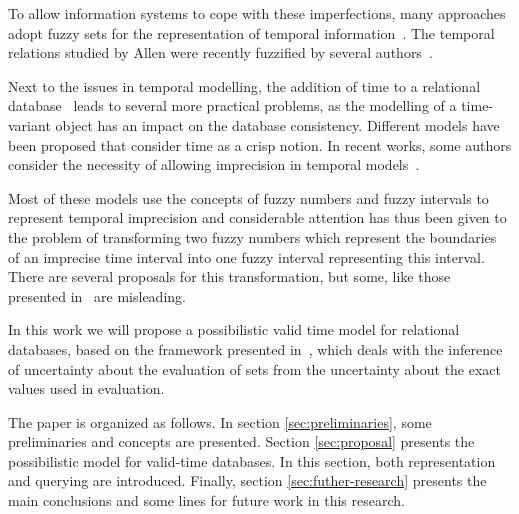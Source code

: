 To allow information systems to cope with these imperfections, many approaches adopt fuzzy sets for the representation of temporal information~\cite{343607,Dubois:jucs_9_9:fuzziness_and_uncertainty_in}. The temporal relations studied by Allen were recently fuzzified by several authors~\cite{ohlbach04,schockaert08}.


Next to the issues in temporal modelling, the addition of time to a relational database~\cite{Dyreson1994} leads to several more practical problems, as the modelling of a time-variant object has an impact on the database consistency. Different models have been proposed \cite{Jensen91,Snodgrass84} that consider time as a crisp notion. In recent works, some authors consider the necessity of allowing imprecision in temporal models~\cite{Cru97,Garrido2009}.

Most of these models use the concepts of fuzzy numbers and fuzzy intervals to represent temporal imprecision and considerable attention has thus been given to the problem of transforming two fuzzy numbers which represent the boundaries of an imprecise time interval into one fuzzy interval representing this interval. There are several proposals for this transformation, but some, like those presented in~\cite{Garrido2009} are misleading. 

In this work we will propose a possibilistic valid time model for relational databases, based on the framework presented in~\cite{Pon11}, which deals with the inference of uncertainty about the evaluation of sets from the uncertainty about the exact values used in evaluation. 

The paper is organized as follows. In section \ref{sec:preliminaries}, some preliminaries and concepts are presented. 
Section \ref{sec:proposal} presents the possibilistic model for valid-time databases. In this section, both representation and querying are introduced.
Finally, section \ref{sec:futher-research} presents the main conclusions and some lines for future work in this research.